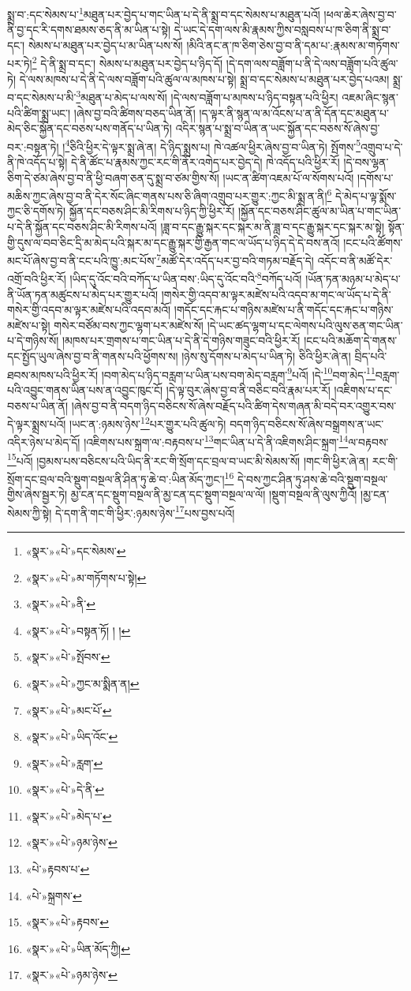 སྨྲ་བ་:དང་སེམས་པ་\footnote{«སྣར་»«པེ་»དང་སེམས་}མཐུན་པར་བྱེད་པ་གང་ཡིན་པ་དེ་ནི་སྨྲ་བ་དང་སེམས་པ་མཐུན་པའོ། །ཕལ་ཆེར་ཞེས་བྱ་བ་ནི་བྱ་དང་རི་དགས་ཐམས་ཅད་ནི་མ་ཡིན་པ་སྟེ། དེ་ཡང་དེ་དག་ལས་མི་རྣམས་ཀྱིས་བསླབས་པ་ཁ་ཅིག་ནི་སྨྲ་བ་དང་། སེམས་པ་མཐུན་པར་བྱེད་པ་མ་ཡིན་པས་སོ། །མིའི་ནང་ན་ཁ་ཅིག་ཅེས་བྱ་བ་ནི་དམ་པ་:རྣམས་མ་གཏོགས་པར་ཏེ།\footnote{«སྣར་»«པེ་»མ་གཏོགས་པ་སྟེ།} དེ་ནི་སྨྲ་བ་དང་། སེམས་པ་མཐུན་པར་བྱེད་པ་ཉིད་དོ། །དེ་དག་ལས་བཟློག་པ་ནི་དེ་ལས་བཟློག་པའི་ཚུལ་ཏེ། དེ་ལས་མཁས་པ་དེ་ནི་དེ་ལས་བཟློག་པའི་ཚུལ་ལ་མཁས་པ་སྟེ། སྨྲ་བ་དང་སེམས་པ་མཐུན་པར་བྱེད་པའམ། སྨྲ་བ་དང་སེམས་པ་མི་\footnote{«སྣར་»«པེ་»ནི་}མཐུན་པ་མེད་པ་ལས་སོ། །དེ་ལས་བཟློག་པ་མཁས་པ་ཉིད་བསྟན་པའི་ཕྱིར། འཇམ་ཞིང་སྙན་པའི་ཚིག་སྨྲ་ཡང་། །ཞེས་བྱ་བའི་ཚིགས་བཅད་ཡིན་ནོ། །ད་ལྟར་ནི་སྙན་ལ་མ་འོངས་པ་ན་ནི་དོན་དང་མཐུན་པ་མེད་ཅིང་སྐྱོན་དང་བཅས་པས་གནོད་པ་ཡིན་ཏེ། འདིར་སྙན་པ་སྨྲ་བ་ཡིན་ན་ཡང་སྐྱོན་དང་བཅས་སོ་ཞེས་བྱ་བར་:བསྟན་ཏེ། །\footnote{«སྣར་»«པེ་»བསྟན་ཏོ། ། །}ཅིའི་ཕྱིར་དེ་ལྟར་སྨྲ་ཞེ་ན། དེ་ཉིད་སྨྲས་པ། ཁེ་འཚལ་ཕྱིར་ཞེས་བྱ་བ་ཡིན་ཏེ། སྤོགས་\footnote{«སྣར་»«པེ་»སྤོབས་}འགྲུབ་པ་དེ་ནི་ཁེ་འདོད་པ་སྟེ། དེ་ནི་ཚོང་པ་རྣམས་ཀྱང་རང་གི་ནོར་འགེད་པར་བྱེད་དེ། ཁེ་འདོད་པའི་ཕྱིར་རོ། །དེ་བས་ལྷན་ཅིག་དེ་ཙམ་ཞེས་བྱ་བ་ནི་ཕྱི་བཞག་ཅན་དུ་སྨྲ་བ་ཙམ་གྱིས་སོ། །ཡང་ན་ཚིག་འཇམ་པོ་ལ་སོགས་པའོ། །དགོས་པ་མཆིས་ཀྱང་ཞེས་བྱ་བ་ནི་དེར་སོང་ཞིང་གནས་པས་ཅི་ཞིག་འགྲུབ་པར་གྱུར་:ཀྱང་མི་སྨྲ་ན་ནི།\footnote{«སྣར་»«པེ་»ཀྱང་མ་སྨིན་ན།} དེ་མེད་པ་ལྟ་སྨོས་ཀྱང་ཅི་དགོས་ཏེ། སྐྱོན་དང་བཅས་ཤིང་མི་རིགས་པ་ཉིད་ཀྱི་ཕྱིར་རོ། །སྐྱོན་དང་བཅས་ཤིང་ཚུལ་མ་ཡིན་པ་གང་ཡིན་པ་དེ་ནི་སྐྱོན་དང་བཅས་ཤིང་མི་རིགས་པའོ། །ཟླ་བ་དང་རྒྱུ་སྐར་དང་སྐར་མ་ནི་ཟླ་བ་དང་རྒྱུ་སྐར་དང་སྐར་མ་སྟེ། སྟོན་གྱི་དུས་ལ་བབ་ཅིང་དྲི་མ་མེད་པའི་སྐར་མ་དང་རྒྱུ་སྐར་གྱི་རྒྱན་གང་ལ་ཡོད་པ་ཉིད་དེ་དེ་བས་ནའོ། །ངང་པའི་ཚོགས་མང་པོ་ཞེས་བྱ་བ་ནི་ངང་པའི་ཁྱུ་:མང་པོས་\footnote{«སྣར་»«པེ་»མང་པོ་}མཚོ་དེར་འདོད་པར་བྱ་བའི་གཏམ་བརྗོད་དེ། འདོང་བ་ནི་མཚོ་དེར་འགྲོ་བའི་ཕྱིར་རོ། །ཡིད་དུ་འོང་བའི་བཀོད་པ་ཡིན་བས་:ཡིད་དུ་འོང་བའི་\footnote{«སྣར་»«པེ་»ཡིད་འོང་}བཀོད་པའོ། །ཡོན་ཏན་མཉམ་པ་མེད་པ་ནི་ཡོན་ཏན་མཚུངས་པ་མེད་པར་གྱུར་པའོ། །གསེར་གྱི་འདབ་མ་ལྟར་མཛེས་པའི་འདབ་མ་གང་ལ་ཡོད་པ་དེ་ནི་གསེར་གྱི་འདབ་མ་ལྟར་མཛེས་པའི་འདབ་མའོ། །གདོང་དང་རྐང་པ་གཉིས་མཛེས་པ་ནི་གདོང་དང་རྐང་པ་གཉིས་མཛེས་པ་སྟེ། གསེར་བཙོམ་བས་ཀྱང་ལྷག་པར་མཛེས་སོ། །དེ་ཡང་ཚད་ལྷག་པ་དང་ལེགས་པའི་ལུས་ཅན་གང་ཡིན་པ་དེ་གཉིས་སོ། །མཁས་པར་གྲགས་པ་གང་ཡིན་པ་དེ་ནི་དེ་གཉིས་གཟུང་བའི་ཕྱིར་རོ། །ངང་པའི་མཆོག་དེ་གནས་དང་སྤྱོད་ཡུལ་ཞེས་བྱ་བ་ནི་གནས་པའི་ཕྱོགས་ས། །ཉེས་སུ་དོགས་པ་མེད་པ་ཡིན་ཏེ། ཅིའི་ཕྱིར་ཞེ་ན། བྲིད་པའི་ཐབས་མཁས་པའི་ཕྱིར་རོ། །བག་མེད་པ་ཉིད་བརླག་པ་ཡིན་པས་བག་མེད་བརླག་\footnote{«སྣར་»«པེ་»རླག་}པའོ། །དེ་\footnote{«སྣར་»«པེ་»དེ་ནི་}བག་མེད་\footnote{«སྣར་»«པེ་»མེད་པ་}བརླག་པའི་འབྱུང་གནས་ཡིན་པས་ན་འབྱུང་ཁུང་ངོ། །དེ་ལྟ་བུར་ཞེས་བྱ་བ་ནི་བཅིང་བའི་རྣམ་པར་རོ། །འཇིགས་པ་དང་བཅས་པ་ཡིན་ནོ། །ཞེས་བྱ་བ་ནི་བདག་ཉིད་བཅིངས་སོ་ཞེས་བརྗོད་པའི་ཚིག་དེས་གཞན་མི་བདེ་བར་འགྱུར་བས་དེ་ལྟར་སྨྲས་པའོ། །ཡང་ན་:ཉམས་ཉེས་\footnote{«སྣར་»«པེ་»ཉམ་ཉེས་}པར་གྱུར་པའི་ཚུལ་ཏེ། བདག་ཉིད་བཅིངས་སོ་ཞེས་བསྒྲགས་ན་ཡང་འདིར་ཉེས་པ་མེད་དོ། །འཇིགས་པས་སྐྲག་ལ་:བརྟབས་པ་\footnote{«པེ་»རྟབས་པ་}གང་ཡིན་པ་དེ་ནི་འཇིགས་ཤིང་སྐྲག་\footnote{«པེ་»སྐྲགས་}ལ་བརྟབས་\footnote{«སྣར་»«པེ་»རྟབས་}པའོ། །བྱམས་པས་བཅིངས་པའི་ཡིད་ནི་རང་གི་སྲོག་དང་བྲལ་བ་ཡང་མི་སེམས་སོ། །གང་གི་ཕྱིར་ཞེ་ན། རང་གི་སྲོག་དང་བྲལ་བའི་སྡུག་བསྔལ་ནི་ཤིན་ཏུ་ཆེ་བ་:ཡིན་མོད་ཀྱང་།\footnote{«སྣར་»«པེ་»ཡིན་མོད་ཀྱི།} དེ་བས་ཀྱང་ཤིན་ཏུ་ཤས་ཆེ་བའི་སྡུག་བསྔལ་གྱིས་ཞེས་སྦྱར་ཏེ། མྱ་ངན་དང་སྡུག་བསྔལ་ནི་མྱ་ངན་དང་སྡུག་བསྔལ་ལ་ལོ། །སྡུག་བསྔལ་ནི་ལུས་ཀྱིའོ། །མྱ་ངན་སེམས་ཀྱི་སྟེ། དེ་དག་ནི་གང་གི་ཕྱིར་:ཉམས་ཉེས་\footnote{«སྣར་»«པེ་»ཉམ་ཉེས་}པས་བྱས་པའོ། 